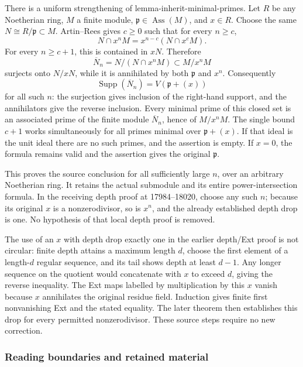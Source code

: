 There is a uniform strengthening of lemma-inherit-minimal-primes. Let \(R\) be any Noetherian ring, \(M\) a finite module, \(\mathfrak p\in\operatorname{Ass}(M)\), and \(x\in R\). Choose the same \(N\cong R/\mathfrak p\subset M\). Artin--Rees gives \(c\geq0\) such that for every \(n\geq c\), \[
N\cap x^nM=x^{n-c}(N\cap x^cM).
\] For every \(n\geq c+1\), this is contained in \(xN\). Therefore \[
\overline N_n=N/(N\cap x^nM)\subset M/x^nM
\] surjects onto \(N/xN\), while it is annihilated by both \(\mathfrak p\) and \(x^n\). Consequently \[
\operatorname{Supp}(\overline N_n)=V(\mathfrak p+(x))
\] for all such \(n\): the surjection gives inclusion of the right-hand support, and the annihilators give the reverse inclusion. Every minimal prime of this closed set is an associated prime of the finite module \(\overline N_n\), hence of \(M/x^nM\). The single bound \(c+1\) works simultaneously for all primes minimal over \(\mathfrak p+(x)\). If that ideal is the unit ideal there are no such primes, and the assertion is empty. If \(x=0\), the formula remains valid and the assertion gives the original \(\mathfrak p\).

This proves the source conclusion for all sufficiently large \(n\), over an arbitrary Noetherian ring. It retains the actual submodule and its entire power-intersection formula. In the receiving depth proof at 17984--18020, choose any such \(n\); because its original \(x\) is a nonzerodivisor, so is \(x^n\), and the already established depth drop is one. No hypothesis of that local depth proof is removed.

The use of an \(x\) with depth drop exactly one in the earlier depth/Ext proof is not circular: finite depth attains a maximum length \(d\), choose the first element of a length-\(d\) regular sequence, and its tail shows depth at least \(d-1\). Any longer sequence on the quotient would concatenate with \(x\) to exceed \(d\), giving the reverse inequality. The Ext maps labelled by multiplication by this \(x\) vanish because \(x\) annihilates the original residue field. Induction gives finite first nonvanishing Ext and the stated equality. The later theorem then establishes this drop for every permitted nonzerodivisor. These source steps require no new correction.

\subsubsection{Reading boundaries and retained material}\label{algebra-proof-007-reading-boundaries-and-retained-material}

